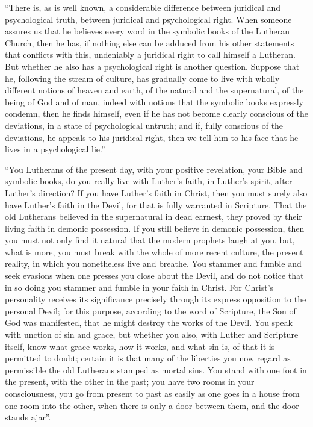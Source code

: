 \documentclass[12pt,a4paper,openany]{book}
\newcommand{\opage}[1]{\marginnote{\footnotesize\textit{[#1]}}}
\begin{document}
``There is, as is well known, a considerable difference
between juridical and psychological truth, between
juridical and psychological right. When someone assures us that
he believes every word in the symbolic books of the Lutheran Church,
then he has, if nothing else can be adduced
from his other statements that conflicts with this,
undeniably a juridical right to call himself a Lutheran. But
whether he also has a psychological right is another
question. Suppose that he, following the stream of culture,
has gradually come to live with wholly different
notions of heaven and earth, of the natural and the
supernatural, of the being of God and of man, indeed with
notions that the symbolic books expressly
condemn, then he finds himself, even if he has not
become clearly conscious of the deviations, in a state of
psychological untruth; and if, fully conscious
of the deviations, he appeals to his juridical
right, then we tell him to his face that he lives in a
psychological lie.''

``You Lutherans of the present day, with your positive revelation,
your Bible and symbolic books, do you really live
with Luther's faith, in Luther's spirit, after Luther's
\setcounter{footnote}{0}%
\opage{99}direction? If you have Luther's faith in Christ, then
you must surely also have Luther's faith in the Devil, for
that is fully warranted in Scripture. That the old
Lutherans believed in the supernatural in dead earnest,
they proved by their living faith in demonic possession.
If you still believe in demonic possession, then
you must not only find it natural that the modern
prophets laugh at you, but, what is more, you must
break with the whole of more recent culture, the present
reality, in which you nonetheless live and breathe. You stammer and
fumble and seek evasions when one presses you
close about the Devil, and do not notice that in so doing you
stammer and fumble in your faith in Christ.
For Christ's personality receives its significance precisely through
its express opposition to the personal Devil;
for this purpose, according to the word of Scripture, the Son of God was manifested,
that he might destroy the works of the Devil. You speak with
unction of sin and grace, but whether you also, with
Luther and Scripture itself, know what grace works,
how it works, and what sin is, of that it is
permitted to doubt; certain it is that many of the liberties
you now regard as permissible the old Lutherans
stamped as mortal sins. You stand with one foot in
the present, with the other in the past; you have two rooms in
your consciousness, you go from present to past as easily as
one goes in a house from one room into the
other, when there is only a door between them, and the door
stands ajar''.
\end{document}

